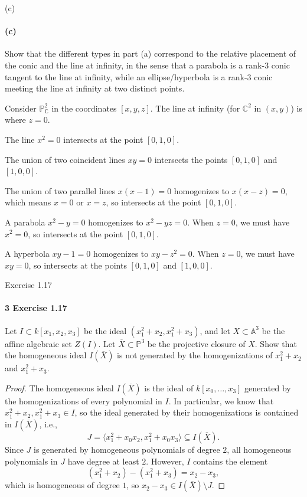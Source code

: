 \documentclass[12pt]{article}
\newlength{\myparskip}
\newenvironment{fullbox}{\begin{lrbox}{\savefullbox}\begin{minipage}{\dimexpr\textwidth-2\fboxsep\relax}\setlength{\parskip}{\myparskip}}{\end{minipage}\end{lrbox}\framebox[\textwidth]{\usebox{\savefullbox}}}
\newenvironment{pbox}[1][]{\begin{fullbox}\ifx#1\empty\else\paragraph{#1}\fi}{\end{fullbox}}
\newcommand{\C}{\mathbb{C}}
\newcommand{\<}{\langle}
\renewcommand{\>}{\rangle}
\newcommand{\clo}{\overline}
\newcommand{\A}{\mathbb{A}}
\renewcommand{\P}{\mathbb{P}}
\begin{document}
\begin{pbox}[(c)]
    Show that the different types in part (a) correspond to the relative placement of the conic and the line at infinity, in the sense that a parabola is a rank-$3$ conic tangent to the line at infinity, while an ellipse/hyperbola is a rank-$3$ conic meeting the line at infinity at two distinct points.
\end{pbox}

Consider $\P_\C^2$ in the coordinates $[x, y, z]$. The line at infinity (for $\C^2$ in $(x, y)$) is where $z = 0$.

The line $x^2 = 0$ intersects at the point $[0, 1, 0]$.

The union of two coincident lines $xy = 0$ intersects the points $[0, 1, 0]$ and $[1, 0, 0]$.

The union of two parallel lines $x(x - 1) = 0$ homogenizes to $x(x - z) = 0$, which means $x = 0$ or $x = z$, so intersects at the point $[0, 1, 0]$.

A parabola $x^2 - y = 0$ homogenizes to $x^2 - yz = 0$. When $z = 0$, we must have $x^2 = 0$, so intersects at the point $[0, 1, 0]$.

A hyperbola $xy - 1 = 0$ homogenizes to $xy - z^2 = 0$. When $z = 0$, we must have $xy = 0$, so intersects at the points $[0, 1, 0]$ and $[1, 0, 0]$.


\newpage
\begin{pbox}[3 Exercise 1.17]
    Let $I \subset k[x_1, x_2, x_3]$ be the ideal $(x_1^2 + x_2, x_1^2 + x_3)$, and let $X \subset \A^3$ be the affine algebraic set $Z(I)$. Let $\clo{X} \subset \P^3$ be the projective closure of $X$. Show that the homogeneous ideal $I(\clo{X})$ is not generated by the homogenizations of $x_1^2 + x_2$ and $x_1^2 + x_3$.
\end{pbox}

\begin{proof}
    The homogeneous ideal $I(\clo{X})$ is the ideal of $k[x_0, \dots, x_3]$ generated by the homogenizations of every polynomial in $I$. In particular, we know that $x_1^2 + x_2, x_1^2 + x_3 \in I$, so the ideal generated by their homogenizations is contained in $I(\clo{X})$, i.e.,
    \[
        J = \<x_1^2 + x_0x_2, x_1^2 + x_0x_3\> \subseteq I(\clo{X}).
    \]
    Since $J$ is generated by homogeneous polynomials of degree $2$, all homogeneous polynomials in $J$ have degree at least $2$. However, $I$ contains the element
    \[
        (x_1^2 + x_2) - (x_1^2 + x_3) = x_2 - x_3,
    \]
    which is homogeneous of degree $1$, so $x_2 - x_3 \in I(\clo{X}) \setminus J$.
    
\end{proof}
\end{document}
